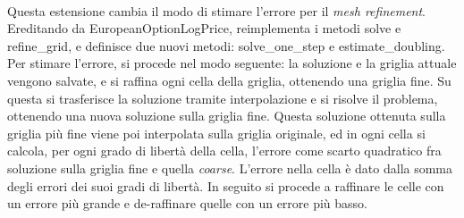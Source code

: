 \documentclass[a4paper,10pt]{report}
\theoremstyle{plain}
\theoremstyle{definition}
\theoremstyle{remark}
\begin{document}
\begin{description}[leftmargin=0cm]
 \item[\bf doubling\_extension] \hfill \\ Questa estensione cambia il modo di stimare l'errore per il \emph{mesh refinement}. Ereditando da \textsf{EuropeanOptionLogPrice}, reimplementa i metodi \textsf{solve} e \textsf{refine\_grid}, e definisce due nuovi metodi: \textsf{solve\_one\_step} e \textsf{estimate\_doubling}. Per stimare l'errore, si procede nel modo seguente: la soluzione e la griglia attuale vengono salvate, e si raffina ogni cella della griglia, ottenendo una griglia fine. Su questa si trasferisce la soluzione tramite interpolazione e si risolve il problema, ottenendo una nuova soluzione sulla griglia fine. Questa soluzione ottenuta sulla griglia più fine viene poi interpolata sulla griglia originale, ed in ogni cella si calcola, per ogni grado di libert\`a della cella, l'errore come scarto quadratico fra soluzione sulla griglia fine e quella \emph{coarse}. L'errore nella cella è dato dalla somma degli errori dei suoi gradi di libertà. In seguito si procede a raffinare le celle con un errore pi\`u grande e de-raffinare quelle con un errore pi\`u basso. 
 

\end{description}
\end{document}
